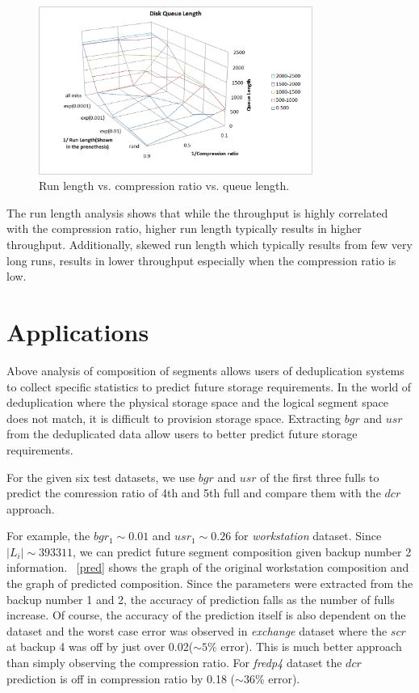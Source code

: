 \begin{figure}[!t]
\centering
\includegraphics[width=0.8\textwidth]{figure/dedup/disk_q}
\captionsetup{format=myformat}
\caption{Run length vs. compression ratio vs. queue length.}
\label{ql}
\end{figure}

The run length analysis shows that while the throughput is highly correlated with the compression ratio, higher run length typically results in higher throughput. Additionally, skewed run length which typically results from few very long runs, results in lower throughput especially when the compression ratio is low.

\section{Applications}\label{appp}
Above analysis of composition of segments allows users of deduplication systems to collect specific statistics to predict future storage requirements. In the world of deduplication where the physical storage space and the logical segment space does not match, it is difficult to provision storage space. Extracting $bgr$ and $usr$ from the deduplicated data allow users to better predict future storage requirements. 

For the given six test datasets, we use $bgr$ and $usr$ of the first three fulls to predict the comression ratio of 4th and 5th full and compare them with the $dcr$ approach.

For example, the $bgr_1\sim 0.01$ and $usr_1\sim 0.26$ for \emph{workstation} dataset. Since $|L_i|\sim393311$,  we can predict future segment composition given backup number 2 information. \figurename~\ref{pred} shows the graph of the original workstation composition and the graph of predicted composition. Since the parameters were extracted from the backup number 1 and 2, the accuracy of prediction falls as the number of fulls increase. Of course, the accuracy of the prediction itself is also dependent on the dataset and the worst case error was observed in \emph{exchange} dataset where the $\mathit{scr}$ at backup 4 was off by just over 0.02($\sim5\%$ error). This is much better approach than simply observing the compression ratio. For \emph{fredp4} dataset the $dcr$  prediction is off in compression ratio by 0.18 ($\sim36\%$ error).

